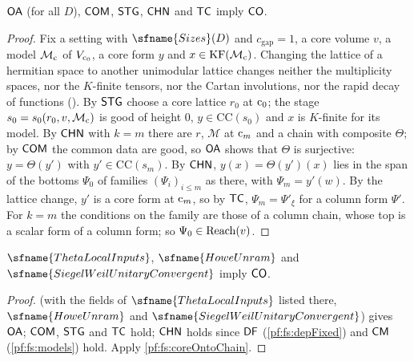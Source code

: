\begin{proposition}\label{pf:fs:coreOntoChain}
$\mathsf{OA}$ (for all $D$), $\mathsf{COM}$, $\mathsf{STG}$, $\mathsf{CHN}$ and $\mathsf{TC}$ imply $\mathsf{CO}$.
\end{proposition}

\begin{proof}
Fix a setting with $\sfname{Sizes}(D)$ and $c_{\mathrm{gap}}=1$, a core volume $v$, a model $\mathcal M_{\mathrm{c}}$ of $V_{\mathrm{c}_0}$, a core
form $y$ and $x\in\mathrm{KF}(\mathcal M_{\mathrm{c}})$. Changing the lattice of a hermitian space to another unimodular lattice changes neither
the multiplicity spaces, nor the $K$-finite tensors, nor the Cartan involutions, nor the rapid decay of functions
(). By $\mathsf{STG}$ choose a core lattice $r_0$ at $\mathrm{c}_0$; the stage
$s_0=s_0(r_0,v,\mathcal M_{\mathrm{c}})$ is good of height $0$, $y\in\mathrm{CC}(s_0)$ and $x$ is $K$-finite for its model. By $\mathsf{CHN}$ with
$k=m$ there are $r$, $\mathcal M$ at $\mathrm{c}_m$ and a chain with composite $\Theta$; by $\mathsf{COM}$ the common data are good, so
$\mathsf{OA}$ shows that $\Theta$ is surjective: $y=\Theta(y')$ with $y'\in\mathrm{CC}(s_m)$. By $\mathsf{CHN}$, $y(x)=\Theta(y')(x)$ lies in
the span of the bottoms $\Psi_0$ of families $(\Psi_i)_{i\le m}$ as there, with $\Psi_m=y'(w)$. By the lattice change, $y'$ is a core form
at $\mathrm{c}_m$, so by $\mathsf{TC}$, $\Psi_m=\Psi'_\xi$ for a column form $\Psi'$. For $k=m$ the conditions on the family are those of a
column chain, whose top is a scalar form of a column form; so $\Psi_0\in\mathrm{Reach}(v)$.
\end{proof}

\begin{theorem}\label{pf:fs:coreOnto}\sloppy
$\sfname{ThetaLocalInputs}$, $\sfname{HoweUnram}$ and $\sfname{SiegelWeilUnitaryConvergent}$ imply $\mathsf{CO}$.
\end{theorem}

\begin{proof}\sloppy
{} (with the fields of $\sfname{ThetaLocalInputs}$ listed there, $\sfname{HoweUnram}$ and
$\sfname{SiegelWeilUnitaryConvergent}$) gives $\mathsf{OA}$; $\mathsf{COM}$, $\mathsf{STG}$ and $\mathsf{TC}$ hold; $\mathsf{CHN}$ holds since $\mathsf{DF}$
(\cref{pf:fs:depFixed}) and $\mathsf{CM}$ (\cref{pf:fs:models}) hold. Apply \cref{pf:fs:coreOntoChain}.
\end{proof}

